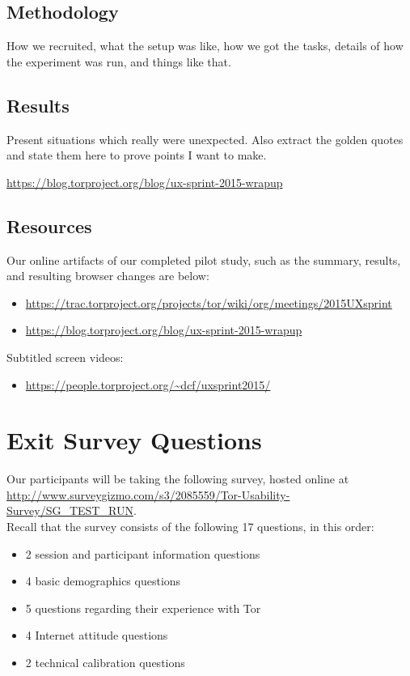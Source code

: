 \documentclass[letterpaper,twocolumn,11pt]{article}
\begin{document}
\subsection{Methodology}
{\color {red} How we recruited, what the setup was like, how we got the tasks, details of 
how the experiment was run, and things like that.}

\subsection{Results}
{\color {red} Present situations which really were unexpected. 
Also extract the golden quotes and state them here 
to prove points I want to make. }

\url{https://blog.torproject.org/blog/ux-sprint-2015-wrapup}

\subsection{Resources}

\indent \indent  Our online artifacts of our completed pilot study, such as 
the summary, results, and resulting browser changes are below:
\begin{itemize} \itemsep1pt \parskip0pt 
\item \url{https://trac.torproject.org/projects/tor/wiki/org/meetings/2015UXsprint}
\item \url{https://blog.torproject.org/blog/ux-sprint-2015-wrapup}
\end{itemize}

\noindent Subtitled screen videos:
\begin{itemize} \itemsep1pt \parskip0pt 
\item \url{https://people.torproject.org/~dcf/uxsprint2015/}
\end{itemize}

\section{Exit Survey Questions}
\label{sec:survey} 
\indent \indent Our participants will be taking the following survey, hosted online at 
\url{http://www.surveygizmo.com/s3/2085559/Tor-Usability-Survey/SG_TEST_RUN}.\\

\noindent Recall that the survey consists of the following 17 questions, in this order: 
\begin{itemize} \itemsep1pt \parskip0pt 
\item 2 session and participant information questions
\item 4 basic demographics questions
\item 5 questions regarding their experience with Tor
\item 4 Internet attitude questions
\item 2 technical calibration questions
\end{itemize}
\end{document}
